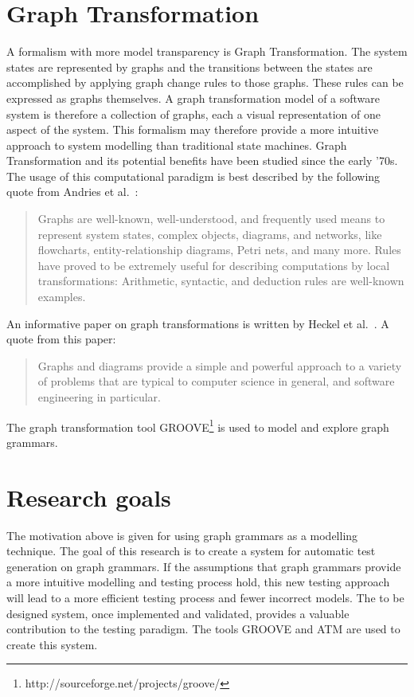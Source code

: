 \section{Graph Transformation}
A formalism with more model transparency is Graph Transformation. The system states are represented by graphs and the transitions between the states are accomplished by applying graph change rules to those graphs. These rules can be expressed as graphs themselves. A graph transformation model of a software system is therefore a collection of graphs, each a visual representation of one aspect of the system. This formalism may therefore provide a more intuitive approach to system modelling than traditional state machines. Graph Transformation and its potential benefits have been studied since the early '70s. The usage of this computational paradigm is best described by the following quote from Andries et al.~\cite{Andries1999}: \begin{quote}Graphs are well-known, well-understood, and frequently used means to represent system states, complex objects, diagrams, and networks, like flowcharts, entity-relationship diagrams, Petri nets, and many more. Rules have proved to be extremely useful for describing computations by local transformations: Arithmetic, syntactic, and deduction rules are well-known examples.\end{quote} An informative paper on graph transformations is written by Heckel et al.~\cite{Heckel2006187}. A quote from this paper: \begin{quote}Graphs and diagrams provide a simple and powerful approach to a variety of problems that are typical to computer science in general, and software engineering in particular.\end{quote}

The graph transformation tool GROOVE\footnote{http://sourceforge.net/projects/groove/} is used to model and explore graph grammars.

\section{Research goals}\label{sec:goals}

The motivation above is given for using graph grammars as a modelling technique. The goal of this research is to create a system for automatic test generation on graph grammars. If the assumptions that graph grammars provide a more intuitive modelling and testing process hold, this new testing approach will lead to a more efficient testing process and fewer incorrect models. The to be designed system, once implemented and validated, provides a valuable contribution to the testing paradigm. The tools GROOVE and ATM are used to create this system.

